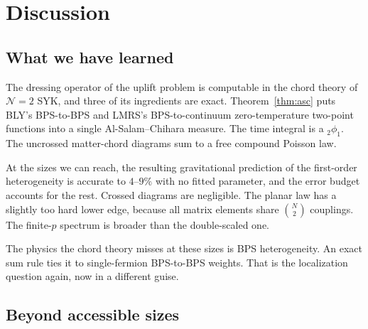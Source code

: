 \documentclass[11pt]{article}
\theoremstyle{plain}
\theoremstyle{remark}
\numberwithin{equation}{section}
\begin{document}
\section{Discussion}\label{sec:discussion}

\subsection{What we have learned}

The dressing operator of the uplift problem is computable in the chord theory of $\mathcal N=2$ SYK, and three of its
ingredients are exact. Theorem~\ref{thm:asc} puts BLY's BPS-to-BPS and LMRS's BPS-to-continuum zero-temperature
two-point functions into a single Al-Salam--Chihara measure. The time integral is a ${}_2\phi_1$. The uncrossed
matter-chord diagrams sum to a free compound Poisson law.

At the sizes we can reach, the resulting gravitational prediction of the first-order heterogeneity is accurate to
$4$--$9\%$ with no fitted parameter, and the error budget accounts for the rest. Crossed diagrams are negligible. The
planar law has a slightly too hard lower edge, because all matrix elements share $\binom N2$ couplings. The finite-$p$
spectrum is broader than the double-scaled one.

The physics the chord theory misses at these sizes is BPS heterogeneity. An exact sum rule ties it to single-fermion
BPS-to-BPS weights. That is the localization question again, now in a different guise.

\subsection{Beyond accessible sizes}
\end{document}
